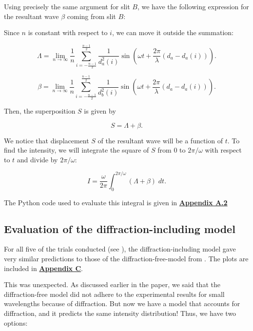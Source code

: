 \documentclass{paper}
\begin{document}
Using precisely the same argument for slit $B$, we have the following expression for the resultant wave $\beta$ coming from slit $B$:

Since $n$ is constant with respect to $i$, we can move it outside the summation:

\begin{equation*}
        \Lambda = \lim_{n \to \infty} \frac{1}{n}\sum_{i = -\frac{n - 1}{2}}^{\frac{n - 1}{2}} \frac{1}{ d_a^2(i)} \sin\left(\omega t + \frac{2\pi}{\lambda}(d_a - d_a(i))\right).
\end{equation*}

\begin{equation*}
    \beta = \lim_{n \to \infty} \frac{1}{n}\sum_{i = -\frac{n - 1}{2}}^{\frac{n - 1}{2}} \frac{1}{d_b^2(i)} \sin\left(\omega t + \frac{2\pi}{\lambda}(d_a - d_a(i))\right).
\end{equation*}

Then, the superposition $S$ is given by

\begin{equation*}
    S = \Lambda + \beta.
\end{equation*}

We notice that displacement $S$ of the resultant wave will be a function of $t$. To find the intensity, we will integrate the square of $S$ from $0$ to $2\pi / \omega$ with respect to $t$ and divide by $2\pi / \omega$:

\begin{equation*}
    I = \frac{\omega}{2\pi}\int_{0}^{2\pi / \omega} (\Lambda + \beta) \; dt.
\end{equation*}

The Python code used to evaluate this integral is given in \textbf{\hyperref[appendix:diffraction-code]{Appendix A.2}}

\subsection{Evaluation of the diffraction-including model}
For all five of the trials conducted (see ), the diffraction-including model gave very similar predictions to those of the diffraction-free-model from . The plots are included in \textbf{\hyperref[appendix:diffraction-plots]{Appendix C}}.

This was unexpected. As discussed earlier in the paper, we said that the diffraction-free model did not adhere to the experimental results for small wavelengths because of diffraction. But now we have a model that accounts for diffraction, and it predicts the same intensity distribution! Thus, we have two options:
\end{document}
